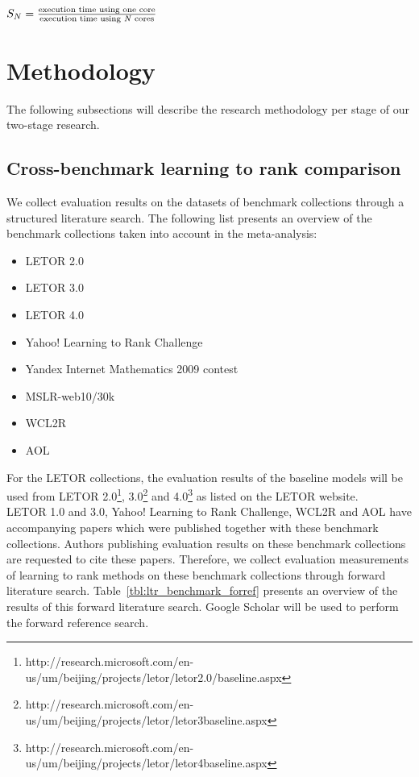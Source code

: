 \documentclass{sig-alternate}
\begin{document}
$S_N = \frac{\text{execution time using one core}}{\text{execution time using \emph{N} cores}}$


\section{Methodology}
The following subsections will describe the research methodology per stage of our two-stage research.
\subsection{Cross-benchmark learning to rank comparison}
We collect evaluation results on the datasets of benchmark collections through a structured literature search. The following list presents an overview of the benchmark collections taken into account in the meta-analysis:
\begin{itemize}\itemsep0em
\item LETOR 2.0
\item LETOR 3.0
\item LETOR 4.0
\item Yahoo! Learning to Rank Challenge
\item Yandex Internet Mathematics 2009 contest
\item MSLR-web10/30k
\item WCL2R
\item AOL
\end{itemize}

For the LETOR collections, the evaluation results of the baseline models will be used from LETOR 2.0\footnote{http://research.microsoft.com/en-us/um/beijing/projects/letor/letor2.0/baseline.aspx}, 3.0\footnote{http://research.microsoft.com/en-us/um/beijing/projects/letor/letor3baseline.aspx} and 4.0\footnote{http://research.microsoft.com/en-us/um/beijing/projects/letor/letor4baseline.aspx} as listed on the LETOR website.\\

LETOR 1.0 and 3.0, Yahoo! Learning to Rank Challenge, WCL2R and AOL have accompanying papers which were published together with these benchmark collections. Authors publishing evaluation results on these benchmark collections are requested to cite these papers. Therefore, we collect evaluation measurements of learning to rank methods on these benchmark collections through forward literature search. Table~\ref{tbl:ltr_benchmark_forref} presents an overview of the results of this forward literature search. Google Scholar will be used to perform the forward reference search.
\end{document}
